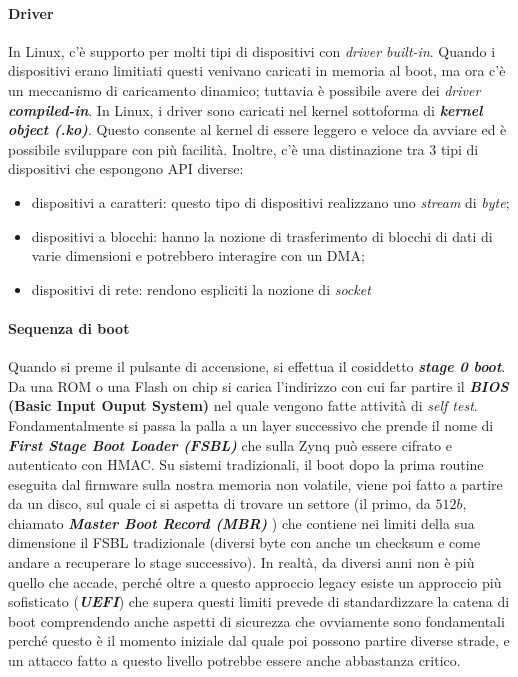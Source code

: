 \documentclass{article}
\begin{document}
\paragraph{Driver}
In Linux, c'è supporto per molti tipi di dispositivi con \textit{driver built-in}. Quando i dispositivi erano limitiati questi venivano caricati in memoria al boot, ma ora c'è un meccanismo di caricamento dinamico; tuttavia è possibile avere dei \textit{driver} \textbf{\textit{compiled-in}}. In Linux, i driver sono caricati nel kernel sottoforma di \textbf{\textit{kernel object (.ko)}}. Questo consente al kernel di essere leggero e veloce da avviare ed è possibile sviluppare con più facilità. Inoltre, c'è una distinazione tra $3$ tipi di dispositivi che espongono API diverse:
\begin{itemize}
  \item dispositivi a caratteri: questo tipo di dispositivi realizzano uno \textit{stream} di \textit{byte};
  \item dispositivi a blocchi: hanno la nozione di trasferimento di blocchi di dati di varie dimensioni e potrebbero interagire con un DMA;
  \item dispositivi di rete: rendono espliciti la nozione di \textit{socket}
\end{itemize}

\paragraph{Sequenza di boot}
Quando si preme il pulsante di accensione, si effettua il cosiddetto \textbf{\textit{stage 0 boot}}. Da una ROM o una Flash on chip si carica l'indirizzo con cui far partire il \textbf{\textit{BIOS} (Basic Input Ouput System)} nel quale vengono fatte attività di \textit{self test}.
Fondamentalmente si passa la palla a un layer successivo che prende il nome di \textbf{\textit{First Stage Boot Loader (FSBL)}} che sulla Zynq può essere cifrato e autenticato con HMAC. Su sistemi tradizionali, il boot dopo la prima routine eseguita dal firmware sulla nostra memoria non volatile, viene poi fatto a partire da un disco, sul quale ci si aspetta di trovare un settore (il primo, da $512b$, chiamato \textbf{\textit{Master Boot Record (MBR) }}) che contiene nei limiti della sua dimensione il FSBL tradizionale (diversi byte con anche un checksum e come andare a recuperare lo stage successivo). In realtà, da diversi anni non è più quello che accade, perché oltre a questo approccio legacy esiste un approccio più sofisticato (\textbf{\textit{UEFI}}) che supera questi limiti prevede di standardizzare la catena di boot comprendendo anche aspetti di sicurezza che ovviamente sono fondamentali perché questo è il momento iniziale dal quale poi possono partire diverse strade, e un attacco fatto a questo livello potrebbe essere anche abbastanza critico.
\end{document}
